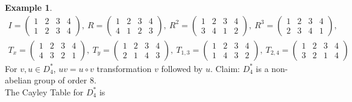 \documentclass[leqno,DIV=calc,paper=a4,fontsize=11pt]{article}
\theoremstyle{definition}
\newtheorem{exmp}[thm]{Example}
\theoremstyle{plain}
\theoremstyle{remark}
\begin{document}
\begin{exmp}
\begin{align*}I=\left(
    \begin{matrix}
      1 & 2 & 3 &4\\
      1 & 2 & 3 &4
    \end{matrix}
    \right),\ R=\left(
    \begin{matrix}
      1 & 2 & 3 &4\\
      4 & 1 & 2 &3
    \end{matrix}
    \right),\ R^2=\left(
    \begin{matrix}
      1 & 2 & 3 &4\\
      3 & 4 & 1 &2
    \end{matrix}
    \right),\ R^3=\left(
    \begin{matrix}
      1 & 2 & 3 &4\\
      2 & 3 & 4 &1
    \end{matrix}
    \right),\\
    T_{x}=\left(
    \begin{matrix}
      1 & 2 & 3 &4\\
      4 & 3 & 2 &1
    \end{matrix}
    \right),\ T_{y}=\left(
    \begin{matrix}
      1 & 2 & 3 &4\\
      2 & 1 & 4 &3
    \end{matrix}
    \right),\ T_{1,3}=\left(
    \begin{matrix}
      1 & 2 & 3 &4\\
      1 & 4 & 3 &2
    \end{matrix}
    \right),\ T_{2,4}=\left(
    \begin{matrix}
      1 & 2 & 3 &4\\
      3 & 2 & 1 &4
    \end{matrix}
    \right)
\end{align*}
For $v,u\in D_{4}^{*}$, $uv=u\circ v$ transformation $v$ followed by $u$. Claim: $D_{4}^{*}$ is a non-abelian group of order 8.\\
The Cayley Table for $D_4^{*}$ is


\end{exmp}
\end{document}
